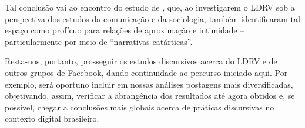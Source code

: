 \documentclass{textolivre-html}
\begin{document}
Tal conclusão vai ao encontro do estudo de \textcite{queiroz2019}, que, ao investigarem o LDRV sob a perspectiva dos estudos da comunicação e da sociologia, também identificaram tal espaço como profícuo para relações de aproximação e intimidade – particularmente por meio de “narrativas catárticas”.

Resta-nos, portanto, prosseguir os estudos discursivos acerca do LDRV e de outros grupos de Facebook, dando continuidade ao percurso iniciado aqui. Por exemplo, será oportuno incluir em nossas análises postagens mais diversificadas, objetivando, assim, verificar a abrangência dos resultados até agora obtidos e, se possível, chegar a conclusões mais globais acerca de práticas discursivas no contexto digital brasileiro.

\printbibliography\label{sec-bib}
\end{document}
